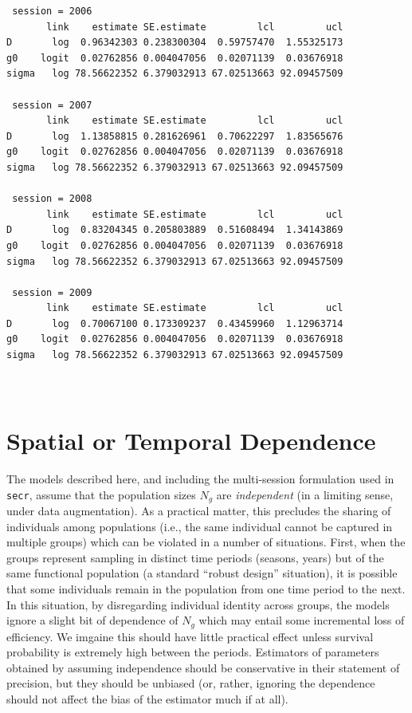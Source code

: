 \begin{verbatim}
 session = 2006 
       link    estimate SE.estimate         lcl         ucl
D       log  0.96342303 0.238300304  0.59757470  1.55325173
g0    logit  0.02762856 0.004047056  0.02071139  0.03676918
sigma   log 78.56622352 6.379032913 67.02513663 92.09457509

 session = 2007 
       link    estimate SE.estimate         lcl         ucl
D       log  1.13858815 0.281626961  0.70622297  1.83565676
g0    logit  0.02762856 0.004047056  0.02071139  0.03676918
sigma   log 78.56622352 6.379032913 67.02513663 92.09457509

 session = 2008 
       link    estimate SE.estimate         lcl         ucl
D       log  0.83204345 0.205803889  0.51608494  1.34143869
g0    logit  0.02762856 0.004047056  0.02071139  0.03676918
sigma   log 78.56622352 6.379032913 67.02513663 92.09457509

 session = 2009 
       link    estimate SE.estimate         lcl         ucl
D       log  0.70067100 0.173309237  0.43459960  1.12963714
g0    logit  0.02762856 0.004047056  0.02071139  0.03676918
sigma   log 78.56622352 6.379032913 67.02513663 92.09457509



\end{verbatim}











\section{Spatial or Temporal Dependence}

The models described here, and including the multi-session formulation
used in \mbox{\tt secr}, assume that the population sizes $N_{g}$ are
{\it independent} (in a limiting sense, under data augmentation).  As
a practical matter, this precludes the sharing of individuals among
populations (i.e., the same individual cannot be captured in multiple
groups) which can be violated in a number of situations.  First, when
the groups represent sampling in distinct time periods (seasons,
years) but of the same functional population (a standard ``robust
design'' situation), it is possible that some individuals remain in
the population from one time period to the next.  In this situation,
by disregarding individual identity across groups, the models ignore a
slight bit of dependence of $N_{g}$ which may entail some incremental
loss of efficiency. We imgaine this should have little practical
effect unless survival probability is extremely high between the
periods.  Estimators of parameters obtained by assuming independence
should be conservative in their statement of precision, but they
should be unbiased (or, rather, ignoring the dependence should not
affect the bias of the estimator much if at all).

